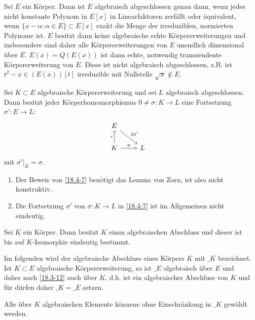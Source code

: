 \begin{kor} \label{18.4-6}
	Sei $E$ ein Körper.
	Dann ist $E$ algebraisch abgeschlossen genau dann, wenn jedes nicht konstante Polynom in $E[x]$ in Linearfaktoren zerfällt oder äquivalent, wenn $\{x - \alpha : \alpha \in E\} \subset E[x]$ exakt die Menge der irreduziblen, normierten Polynome ist.
	$E$ besitzt dann keine algebraische echte Körpererweiterungen und insbesondere sind daher alle Körpererweiterungen von $E$ unendlich dimensional über $E$.
	$E(x) = Q(E(x))$ ist dann echte, notwendig transzendente Körpererweiterung von $E$.
	Diese ist nicht algebraisch abgeschlossen, z.B. ist $t^2 - x \in (E(x))[t]$ irreduzible mit Nullstelle $\sqrt x \not\in E$.
\end{kor}

\begin{st}[Fortsetzungsatz] \label{18.4-7}
	Sei $K \subset E$ algebraische Körpererweiterung und sei $L$ algebraisch abgeschlossen.
	Dann besitzt jeder Körperhomomorphismus $0 \neq \sigma: K \to L$ eine Fortsetzung $\sigma': E \to L$:
	\[
		\begin{tikzcd}
			E \arrow{dr}{\exists \sigma'} & \\
			K \arrow{u}{\iota} \arrow{r}{\sigma} & L
		\end{tikzcd}
	\]
	mit $\sigma'|_K = \sigma$.
\end{st}

\begin{nt} \label{18.4-8}
	\begin{enumerate}[1.)]
		\item
			Der Beweis von \ref{18.4-7} benötigt das Lemma von Zorn, ist also nicht konstruktiv.
		\item
			Die Fortsetzung $\sigma'$ von $\sigma: K \to L$ in \ref{18.4-7} ist im Allgemeinen nicht eindeutig.
	\end{enumerate}
\end{nt}

\begin{st} \label{18.4-9}
	Sei $K$ ein Körper.
	Dann besitzt $K$ einen algebraischen Abschluss und dieser ist bis auf $K$-Isomorphie eindeutig bestimmt.
\end{st}

\begin{conv*}
	Im folgenden wird der algebraische Abschluss eines Körpers $K$ mit $\_K$ bezeichnet.
	Ist $K \subset E$ algebraische Körpererweiterung, so ist $\_E$ algebraisch über $E$ und daher nach \ref{18.3-12} auch über $K$, d.h. ist ein algebraischer Abschluss von $K$ und für dürfen daher $\_K = \_E$ setzen.

	Alle über $K$ algebraischen Elemente könnene ohne Einschränkung in $\_K$ gewählt werden.
\end{conv*}

